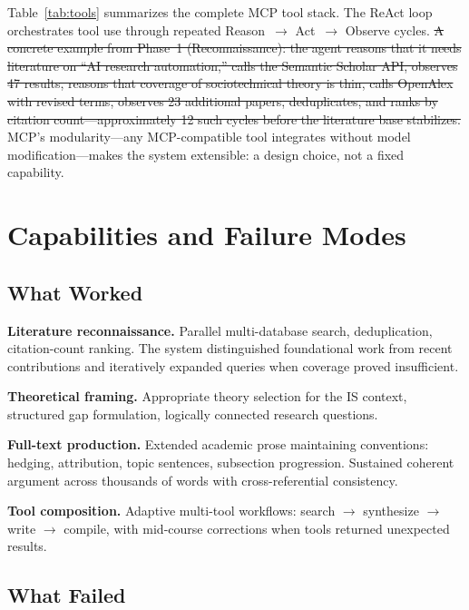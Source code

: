 \documentclass{article}
\providecommand{\DIFdeltex}[1]{{\protect\color{red}\sout{#1}}}                      %
\providecommand{\DIFdelbegin}{} %
\providecommand{\DIFdelend}{} %
\providecommand{\DIFdel}[1]{\texorpdfstring{\DIFdeltex{#1}}{}} %
\newcommand{\DIFscaledelfig}{0.5}
\newlength{\DIFdelgraphicswidth} %
\newlength{\DIFdelgraphicsheight} %
\newcommand{\DIFdelincludegraphics}[2][]{%
\sbox{\DIFdelgraphicsbox}{\DIFOincludegraphics[#1]{#2}}%
\settoboxwidth{\DIFdelgraphicswidth}{\DIFdelgraphicsbox} %
\settoboxtotalheight{\DIFdelgraphicsheight}{\DIFdelgraphicsbox} %
\scalebox{\DIFscaledelfig}{%
\parbox[b]{\DIFdelgraphicswidth}{\usebox{\DIFdelgraphicsbox}\\[-\baselineskip] \rule{\DIFdelgraphicswidth}{0em}}\llap{\resizebox{\DIFdelgraphicswidth}{\DIFdelgraphicsheight}{%
\setlength{\unitlength}{\DIFdelgraphicswidth}%
\begin{picture}(1,1)%
\thicklines\linethickness{2pt} %
{\color[rgb]{1,0,0}\put(0,0){\framebox(1,1){}}}%
{\color[rgb]{1,0,0}\put(0,0){\line( 1,1){1}}}%
{\color[rgb]{1,0,0}\put(0,1){\line(1,-1){1}}}%
\end{picture}%
}\hspace*{3pt}}} %
} %
\DeclareRobustCommand{\DIFdelbegin}{\DIFOdelbegin \let\includegraphics\DIFdelincludegraphics} %
\DeclareRobustCommand{\DIFdelend}{\DIFOaddend \let\includegraphics\DIFOincludegraphics} %
\begin{document}
Table~\ref{tab:tools} summarizes the complete MCP tool stack. The ReAct loop \citep{yao2022react} orchestrates tool use through repeated Reason~$\rightarrow$ Act~$\rightarrow$ Observe cycles. \DIFdelbegin \DIFdel{A concrete example from Phase~1 (Reconnaissance): the agent reasons that it needs literature on ``AI research automation,'' calls the Semantic Scholar API, observes 47 results, reasons that coverage of sociotechnical theory is thin, calls OpenAlex with revised terms, observes 23 additional papers, deduplicates, and ranks by citation count---approximately 12 such cycles before the literature base stabilizes. }\DIFdelend MCP's modularity---any MCP-compatible tool integrates without model modification---makes the system extensible: a design choice, not a fixed capability.

\section{Capabilities and Failure Modes}
\label{sec:capabilities}

\subsection{What Worked}

\textbf{Literature reconnaissance.} Parallel multi-database search, deduplication, citation-count ranking. The system distinguished foundational work from recent contributions and iteratively expanded queries when coverage proved insufficient.

\textbf{Theoretical framing.} Appropriate theory selection for the IS context, structured gap formulation, logically connected research questions.

\textbf{Full-text production.} Extended academic prose maintaining conventions: hedging, attribution, topic sentences, subsection progression. Sustained coherent argument across thousands of words with cross-referential consistency.

\textbf{Tool composition.} Adaptive multi-tool workflows: search $\rightarrow$ synthesize $\rightarrow$ write $\rightarrow$ compile, with mid-course corrections when tools returned unexpected results.

\subsection{What Failed}
\end{document}
